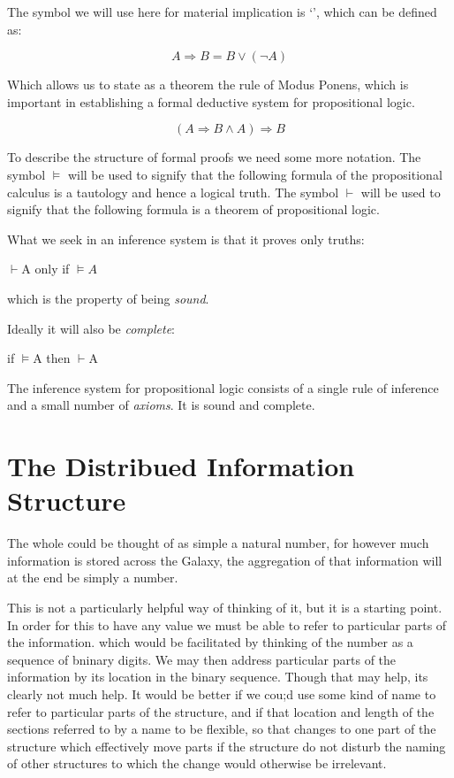 \documentclass[10pt,titlepage]{book}
\begin{document}
The symbol we will use here for material implication is `\Rightarrow{}', which can be defined as:


\[ A \Rightarrow{} B = B \lor{} (\lnot{} A)\]

Which allows us to state as a theorem the rule of Modus Ponens, which is important in establishing a formal deductive system for propositional logic.


\[ (A \Rightarrow{} B \land{} A)  \Rightarrow{} B\]

To describe the structure of formal proofs we need some more notation.
The symbol $\vDash{}$ will be used to signify that the following formula of the propositional calculus is a tautology and hence a logical truth.
The symbol  $\vdash{}$ will be used to signify that the following formula is a theorem of propositional logic.

What we seek in an inference system is that it proves only truths:

\begin{center}
  $\vdash{}$A only if $\vDash{}A$
  \end{center}

which is the property of being \emph{sound}.

Ideally it will also be \emph{complete}:

\begin{center}
  if $\vDash{}$A then $\vdash{}$A
\end{center}

The inference system for propositional logic consists of a single rule of inference and a small number of \emph{axioms}.
It is sound and complete.


\section{The Distribued Information Structure}

The whole could be thought of as simple a natural number, for however much information is stored across the Galaxy, the aggregation of that information will at the end be simply a number.

This is not a particularly helpful way of thinking of it, but it is a starting point.
In order for this to have any value we must be able to refer to particular parts of the information. which would be facilitated by thinking of the number as a sequence of bninary digits.
We may then address particular parts of the information by its location in the binary sequence.
Though that may help, its clearly not much help.
It would be better if we cou;d use some kind of name to refer to particular parts of the structure, and if that location and length of the sections referred to by a name to be flexible, so that changes to one part of the structure which effectively move parts if the structure do not disturb the naming of other structures to which the change would otherwise be irrelevant.
\end{document}
